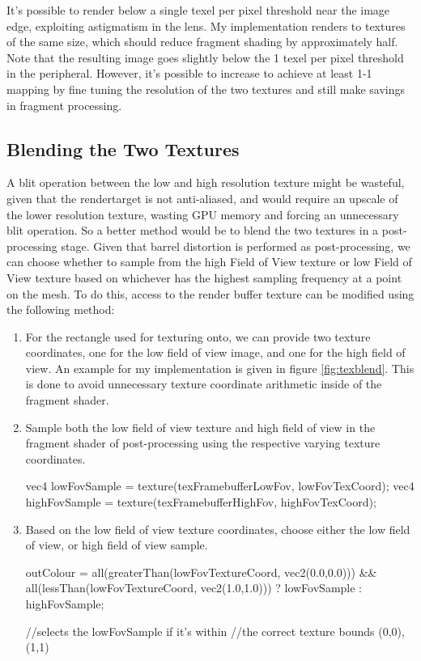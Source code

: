 \documentclass[12pt,a4paper,twoside,openright]{report}
\begin{document}
It's possible to render below a single texel per pixel threshold near the image edge, exploiting astigmatism in the lens. My implementation renders to textures of the same size, which should reduce fragment shading by approximately half. Note that the resulting image goes slightly below the 1 texel per pixel threshold in the peripheral. However, it's possible to increase to achieve at least 1-1 mapping by fine tuning the resolution of the two textures and still make savings in fragment processing.

\subsection{Blending the Two Textures}\label{blending}

A blit operation between the low and high resolution texture might be wasteful, given that the rendertarget is not anti-aliased, and would require an upscale of the lower resolution texture, wasting GPU memory and forcing an unnecessary blit operation. So a better method would be to blend the two textures in a post-processing stage. Given that barrel distortion is performed as post-processing, we can choose whether to sample from the high Field of View texture or low Field of View texture based on whichever has the highest sampling frequency at a point on the mesh. To do this, access to the render buffer texture can be modified using the following method:

\begin{enumerate}
\item For the rectangle used for texturing onto, we can provide two texture coordinates, one for the low field of view image, and one for the high field of view. An example for my implementation is given in figure \ref{fig:texblend}. This is done to avoid unnecessary texture coordinate arithmetic inside of the fragment shader.
\item Sample both the low field of view texture and high field of view in the fragment shader of post-processing using the respective varying texture coordinates.
\begin{blockcode}
	vec4 lowFovSample = texture(texFramebufferLowFov, lowFovTexCoord);
	vec4 highFovSample = texture(texFramebufferHighFov, highFovTexCoord);
\end{blockcode}

\item Based on the low field of view texture coordinates, choose either the low field of view, or high field of view sample.

\begin{blockcode}	
	outColour = all(greaterThan(lowFovTextureCoord, vec2(0.0,0.0))) 
		    && all(lessThan(lowFovTextureCoord, vec2(1.0,1.0))) 
		    ? lowFovSample : highFovSample;

	//selects the lowFovSample if it's within 
	//the correct texture bounds (0,0), (1,1) 
\end{blockcode}
\end{enumerate}
\end{document}
